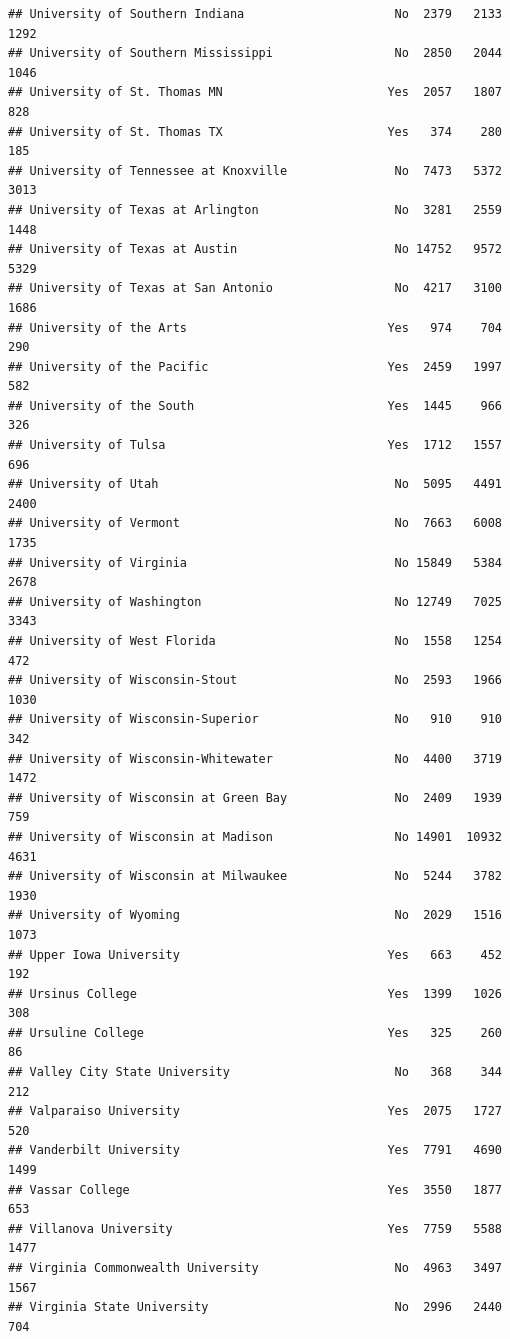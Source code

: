 \documentclass[
]{article}
\begin{document}
\begin{verbatim}
## University of Southern Indiana                     No  2379   2133   1292
## University of Southern Mississippi                 No  2850   2044   1046
## University of St. Thomas MN                       Yes  2057   1807    828
## University of St. Thomas TX                       Yes   374    280    185
## University of Tennessee at Knoxville               No  7473   5372   3013
## University of Texas at Arlington                   No  3281   2559   1448
## University of Texas at Austin                      No 14752   9572   5329
## University of Texas at San Antonio                 No  4217   3100   1686
## University of the Arts                            Yes   974    704    290
## University of the Pacific                         Yes  2459   1997    582
## University of the South                           Yes  1445    966    326
## University of Tulsa                               Yes  1712   1557    696
## University of Utah                                 No  5095   4491   2400
## University of Vermont                              No  7663   6008   1735
## University of Virginia                             No 15849   5384   2678
## University of Washington                           No 12749   7025   3343
## University of West Florida                         No  1558   1254    472
## University of Wisconsin-Stout                      No  2593   1966   1030
## University of Wisconsin-Superior                   No   910    910    342
## University of Wisconsin-Whitewater                 No  4400   3719   1472
## University of Wisconsin at Green Bay               No  2409   1939    759
## University of Wisconsin at Madison                 No 14901  10932   4631
## University of Wisconsin at Milwaukee               No  5244   3782   1930
## University of Wyoming                              No  2029   1516   1073
## Upper Iowa University                             Yes   663    452    192
## Ursinus College                                   Yes  1399   1026    308
## Ursuline College                                  Yes   325    260     86
## Valley City State University                       No   368    344    212
## Valparaiso University                             Yes  2075   1727    520
## Vanderbilt University                             Yes  7791   4690   1499
## Vassar College                                    Yes  3550   1877    653
## Villanova University                              Yes  7759   5588   1477
## Virginia Commonwealth University                   No  4963   3497   1567
## Virginia State University                          No  2996   2440    704

\end{verbatim}
\end{document}
